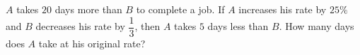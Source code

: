 $A$ takes $20$ days more than $B$ to complete a job. If $A$ increases his rate by $25\%$ and $B$ decreases his rate by $\dfrac13$, then $A$ takes $5$ days less than $B$. How many days does $A$ take at his original rate?
